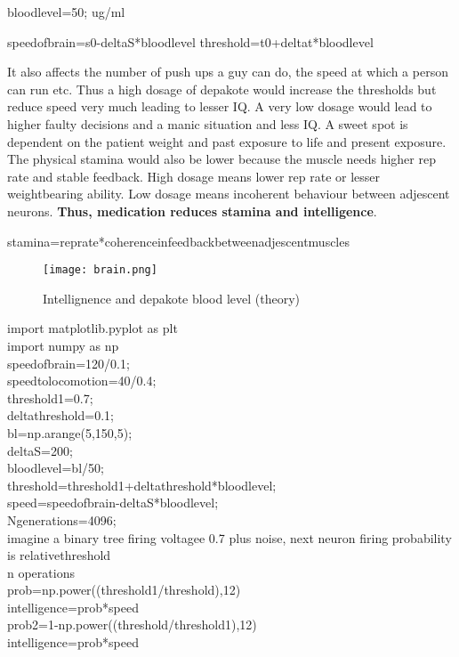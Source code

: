 \documentclass[a4paper]{article}
\begin{document}
bloodlevel=50; ug/ml

speedofbrain=s0-deltaS*bloodlevel
threshold=t0+deltat*bloodlevel

It also affects the number of push ups a guy can do, the speed at which  a person can run etc. Thus a high dosage of depakote would increase the thresholds but reduce speed very much leading to lesser IQ. A very low dosage would lead to higher faulty decisions and a manic situation and less IQ. A sweet spot is dependent on the patient weight and past exposure to life and present exposure. The physical stamina would also be lower because the muscle needs higher rep rate and stable feedback. High dosage means lower rep rate or lesser weightbearing ability. Low dosage means incoherent behaviour between adjescent neurons. \textbf{Thus, medication reduces stamina and intelligence}.

stamina=reprate*coherenceinfeedbackbetweenadjescentmuscles

 

\begin{figure}
\centering
\texttt{[image: brain.png]}
\caption{\label{fig:Lorenz}Intellignence and depakote blood level (theory)}
\end{figure}

import matplotlib.pyplot as plt\\
import numpy as np\\
speedofbrain=120/0.1;\\
speedtolocomotion=40/0.4;\\
threshold1=0.7;\\
deltathreshold=0.1;\\
bl=np.arange(5,150,5);\\
deltaS=200;\\
bloodlevel=bl/50;\\
threshold=threshold1+deltathreshold*bloodlevel;\\
speed=speedofbrain-deltaS*bloodlevel;\\
Ngenerations=4096;\\

imagine a binary tree firing voltagee 0.7 plus noise, next neuron firing probability is relativethreshold\\
n operations\\

prob=np.power((threshold1/threshold),12)\\
intelligence=prob*speed\\
prob2=1-np.power((threshold/threshold1),12)\\
intelligence=prob*speed\\
\end{document}
